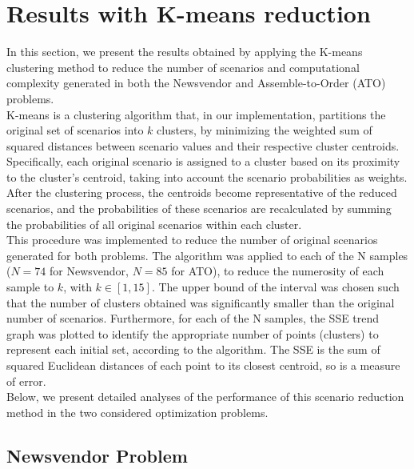 \documentclass[a4paper,12pt]{article}
\begin{document}
	
	\newpage
	\section{Results with K-means reduction}
	
	In this section, we present the results obtained by applying the K-means clustering method to reduce the number of scenarios and computational complexity generated in both the Newsvendor and Assemble-to-Order (ATO) problems.\\ 
	
	\noindent K-means is a clustering algorithm that, in our implementation, partitions the original set of scenarios into \(k\) clusters, by minimizing the weighted sum of squared distances between scenario values and their respective cluster centroids. Specifically, each original scenario is assigned to a cluster based on its proximity to the cluster's centroid, taking into account the scenario probabilities as weights. 
	After the clustering process, the centroids become representative of the reduced scenarios, and the probabilities of these scenarios are recalculated by summing the probabilities of all original scenarios within each cluster.\\
	
	\noindent This procedure was implemented to reduce the number of original scenarios generated for both problems. The algorithm was applied to each of the N samples ($N = 74$ for Newsvendor, $N = 85$ for ATO), to reduce the numerosity of each sample to $k$, with $k \in [1,15]$. The upper bound of the interval was chosen such that the number of clusters obtained was significantly smaller than the original number of scenarios. Furthermore, for each of the N samples, the SSE trend graph was plotted to identify the appropriate number of points (clusters) to represent each initial set, according to the algorithm. The SSE is the sum of squared Euclidean distances of each point to its closest centroid, so is a measure of error.\\
	
	\noindent Below, we present detailed analyses of the performance of this scenario reduction method in the two considered optimization problems.
	\newpage
	\subsection{Newsvendor Problem}
	
\end{document}
